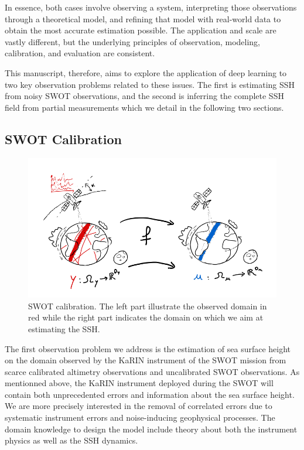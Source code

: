 \begin{bibunit}
In essence, both cases involve observing a system, interpreting those observations through a theoretical model, and refining that model with real-world data to obtain the most accurate estimation possible. The application and scale are vastly different, but the underlying principles of observation, modeling, calibration, and evaluation are consistent.

This manuscript, therefore, aims to explore the application of deep learning to two key observation problems related to these issues. The first is estimating SSH from noisy SWOT observations, and the second is inferring the complete SSH field from partial measurements which we detail in the following two sections.
  



\subsection{SWOT Calibration}

  \begin{figure}
      \centering
            \includegraphics[width=\linewidth]{Introduction/pics/calib_task.png}    
      \caption{SWOT calibration. The left part illustrate the observed domain in red while the right part indicates the domain on which we aim at estimating the SSH.}
      \label{fig:calibration_task}
  \end{figure}
The first observation problem we address is the estimation of sea surface height on the domain observed by the KaRIN instrument of the SWOT mission from scarce calibrated altimetry observations and uncalibrated SWOT observations.
As mentionned above, the KaRIN instrument deployed during the SWOT will contain both unprecedented errors and information about the sea surface height.
We are more precisely interested in the removal of correlated errors due to systematic instrument errors and noise-inducing geophysical processes.
The domain knowledge to design the model include theory about both the instrument physics as well as the SSH dynamics.


\end{bibunit}

